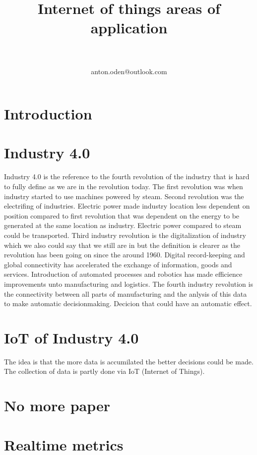 \documentclass[article,a4paper]{IEEEtran}
\title{Internet of things areas of application}
\author{
\IEEEauthorblockN{Anton Odén}\\
\IEEEauthorblockA{Dept. of Maths and Computer Science\\Karlstad University\\
651 88 KARLSTAD, Sweden}\\
anton.oden@outlook.com
}
\begin{document}
\maketitle
\begin{abstract}
    \end{abstract}
    
    \section{Introduction}
    
    \section{Industry 4.0}
    Industry 4.0 is the reference to the fourth revolution of the industry that is hard to fully define as we are in the revolution today. The first revolution was when industry started to use machines powered by steam. Second revolution was the electrifing of industries. Electric power made industry location less dependent on position compared to first revolution that was dependent on the energy to be generated at the same location as industry. Electric power compared to steam could be transported. Third industry revolution is the digitalization of industry which we also could say that we still are in but the definition is clearer as the revolution has been going on since the around 1960. Digital record-keeping and global connectivity has accelerated the exchange of information, goods and services. Introduction of automated processes and robotics has made efficience improvements unto manufacturing and logistics. 
    The fourth industry revolution is the connectivity between all parts of manufacturing and the anlysis of this data to make automatic decisionmaking. Decicion that could have an automatic effect. 
    \section{IoT of Industry 4.0}
    The idea is that the more data is accumilated the better decisions could be made. The collection of data is partly done via IoT (Internet of Things).
    
    \section{No more paper}
    \section{Realtime metrics}
\end{document}
